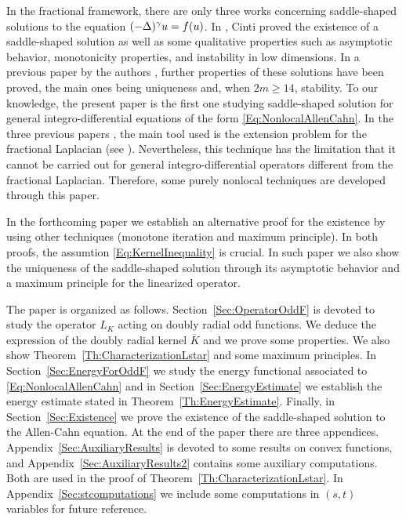 In the fractional framework, there are only three works concerning saddle-shaped solutions to the equation $(-\Delta)^\gamma u = f(u)$. In  \cite{Cinti-Saddle,Cinti-Saddle2}, Cinti proved the existence of a saddle-shaped solution as well as some qualitative properties such as asymptotic behavior, monotonicity properties, and instability in low dimensions. In a previous paper by the authors \cite{Felipe-Sanz-Perela:SaddleFractional}, further properties of these solutions have been proved, the main ones being uniqueness and, when $2m\geq 14$, stability. To our knowledge, the present paper is the first one studying saddle-shaped solution for general integro-differential equations of the form \eqref{Eq:NonlocalAllenCahn}. In the three previous papers \cite{Cinti-Saddle, Cinti-Saddle2, Felipe-Sanz-Perela:SaddleFractional}, the main tool used is the extension problem for the fractional Laplacian (see \cite{CaffarelliSilvestre}). Nevertheless, this technique has the limitation that it cannot be carried out for general integro-differential operators different from the fractional Laplacian. Therefore, some purely nonlocal techniques are developed through this paper.

In the forthcoming paper \cite{FelipeSanz-Perela:IntegroDifferentialII} we establish an alternative proof for the existence by using other techniques (monotone iteration and maximum principle). In both proofs, the assumtion \eqref{Eq:KernelInequality} is crucial. In such paper we also show the uniqueness of the saddle-shaped solution through its asymptotic behavior and a maximum principle for the linearized operator.

The paper is organized as follows. Section~\ref{Sec:OperatorOddF} is devoted to study the operator $L_K$ acting on doubly radial odd functions. We deduce the expression of the doubly radial kernel $\overline{K}$ and we prove some properties. We also show Theorem~\ref{Th:CharacterizationLstar} and some maximum principles. In Section~\ref{Sec:EnergyForOddF} we study the energy functional associated to \eqref{Eq:NonlocalAllenCahn} and in Section~\ref{Sec:EnergyEstimate} we establish the energy estimate stated in Theorem~\ref{Th:EnergyEstimate}. Finally, in Section~\ref{Sec:Existence} we prove the existence of the saddle-shaped solution to the Allen-Cahn equation. At the end of the paper there are three appendices. Appendix~\ref{Sec:AuxiliaryResults} is devoted to some results on convex functions, and Appendix~\ref{Sec:AuxiliaryResults2} contains some auxiliary computations. Both are used in the proof of Theorem~\ref{Th:CharacterizationLstar}. In Appendix~\ref{Sec:stcomputations} we include some computations in $(s,t)$ variables for future reference.